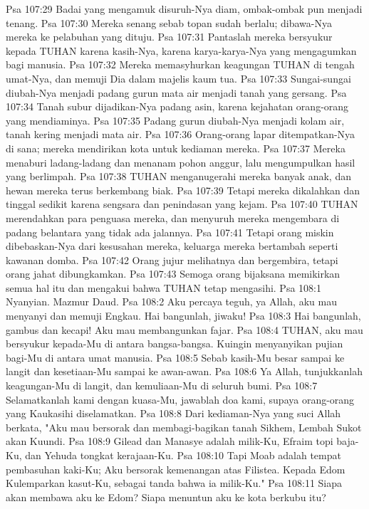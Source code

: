 Psa 107:29  Badai yang mengamuk disuruh-Nya diam, ombak-ombak pun menjadi tenang.
Psa 107:30  Mereka senang sebab topan sudah berlalu; dibawa-Nya mereka ke pelabuhan yang dituju.
Psa 107:31  Pantaslah mereka bersyukur kepada TUHAN karena kasih-Nya, karena karya-karya-Nya yang mengagumkan bagi manusia.
Psa 107:32  Mereka memasyhurkan keagungan TUHAN di tengah umat-Nya, dan memuji Dia dalam majelis kaum tua.
Psa 107:33  Sungai-sungai diubah-Nya menjadi padang gurun mata air menjadi tanah yang gersang.
Psa 107:34  Tanah subur dijadikan-Nya padang asin, karena kejahatan orang-orang yang mendiaminya.
Psa 107:35  Padang gurun diubah-Nya menjadi kolam air, tanah kering menjadi mata air.
Psa 107:36  Orang-orang lapar ditempatkan-Nya di sana; mereka mendirikan kota untuk kediaman mereka.
Psa 107:37  Mereka menaburi ladang-ladang dan menanam pohon anggur, lalu mengumpulkan hasil yang berlimpah.
Psa 107:38  TUHAN menganugerahi mereka banyak anak, dan hewan mereka terus berkembang biak.
Psa 107:39  Tetapi mereka dikalahkan dan tinggal sedikit karena sengsara dan penindasan yang kejam.
Psa 107:40  TUHAN merendahkan para penguasa mereka, dan menyuruh mereka mengembara di padang belantara yang tidak ada jalannya.
Psa 107:41  Tetapi orang miskin dibebaskan-Nya dari kesusahan mereka, keluarga mereka bertambah seperti kawanan domba.
Psa 107:42  Orang jujur melihatnya dan bergembira, tetapi orang jahat dibungkamkan.
Psa 107:43  Semoga orang bijaksana memikirkan semua hal itu dan mengakui bahwa TUHAN tetap mengasihi.
Psa 108:1  Nyanyian. Mazmur Daud.
Psa 108:2  Aku percaya teguh, ya Allah, aku mau menyanyi dan memuji Engkau. Hai bangunlah, jiwaku!
Psa 108:3  Hai bangunlah, gambus dan kecapi! Aku mau membangunkan fajar.
Psa 108:4  TUHAN, aku mau bersyukur kepada-Mu di antara bangsa-bangsa. Kuingin menyanyikan pujian bagi-Mu di antara umat manusia.
Psa 108:5  Sebab kasih-Mu besar sampai ke langit dan kesetiaan-Mu sampai ke awan-awan.
Psa 108:6  Ya Allah, tunjukkanlah keagungan-Mu di langit, dan kemuliaan-Mu di seluruh bumi.
Psa 108:7  Selamatkanlah kami dengan kuasa-Mu, jawablah doa kami, supaya orang-orang yang Kaukasihi diselamatkan.
Psa 108:8  Dari kediaman-Nya yang suci Allah berkata, "Aku mau bersorak dan membagi-bagikan tanah Sikhem, Lembah Sukot akan Kuundi.
Psa 108:9  Gilead dan Manasye adalah milik-Ku, Efraim topi baja-Ku, dan Yehuda tongkat kerajaan-Ku.
Psa 108:10  Tapi Moab adalah tempat pembasuhan kaki-Ku; Aku bersorak kemenangan atas Filistea. Kepada Edom Kulemparkan kasut-Ku, sebagai tanda bahwa ia milik-Ku."
Psa 108:11  Siapa akan membawa aku ke Edom? Siapa menuntun aku ke kota berkubu itu?
